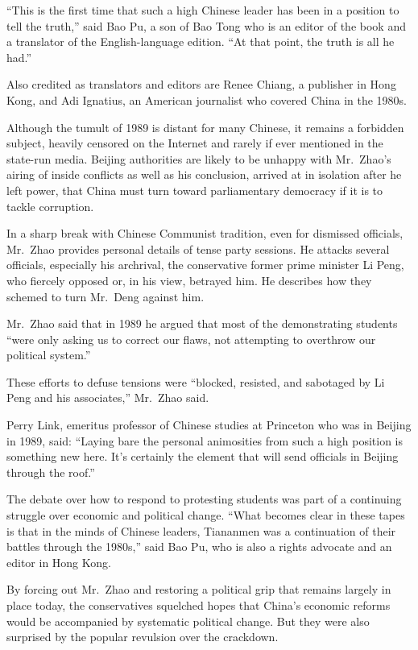 \documentclass[12pt,a4paper,onecolumn]{article}
\begin{document}
``This is the first time that such a high Chinese leader has been in a position to tell the truth,''
said Bao Pu, a son of Bao Tong who is an editor of the book and a translator of the English-language
edition. ``At that point, the truth is all he had.''

Also credited as translators and editors are Renee Chiang, a publisher in Hong Kong, and Adi
Ignatius, an American journalist who covered China in the 1980s.

Although the tumult of 1989 is distant for many Chinese, it remains a forbidden subject, heavily
censored on the Internet and rarely if ever mentioned in the state-run media. Beijing authorities
are likely to be unhappy with Mr.~Zhao's airing of inside conflicts as well as his conclusion,
arrived at in isolation after he left power, that China must turn toward parliamentary democracy if
it is to tackle corruption.

In a sharp break with Chinese Communist tradition, even for dismissed officials, Mr.~Zhao provides
personal details of tense party sessions. He attacks several officials, especially his archrival,
the conservative former prime minister Li Peng, who fiercely opposed or, in his view, betrayed him.
He describes how they schemed to turn Mr.~Deng against him.

Mr.~Zhao said that in 1989 he argued that most of the demonstrating students ``were only asking us
to correct our flaws, not attempting to overthrow our political system.''

These efforts to defuse tensions were ``blocked, resisted, and sabotaged by Li Peng and his
associates,'' Mr.~Zhao said.

Perry Link, emeritus professor of Chinese studies at Princeton who was in Beijing in 1989, said:
``Laying bare the personal animosities from such a high position is something new here. It's
certainly the element that will send officials in Beijing through the roof.''

The debate over how to respond to protesting students was part of a continuing struggle over
economic and political change. ``What becomes clear in these tapes is that in the minds of Chinese
leaders, Tiananmen was a continuation of their battles through the 1980s,'' said Bao Pu, who is also
a rights advocate and an editor in Hong Kong.

By forcing out Mr.~Zhao and restoring a political grip that remains largely in place today, the
conservatives squelched hopes that China's economic reforms would be accompanied by systematic
political change. But they were also surprised by the popular revulsion over the crackdown.
\end{document}
